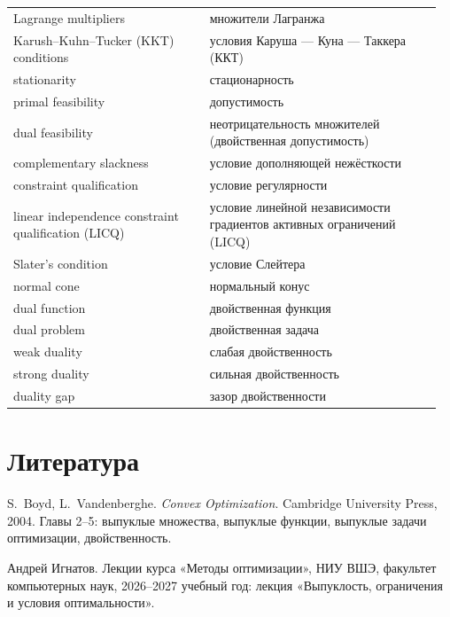 \documentclass[11pt,a4paper]{article}
\begin{document}
\begin{longtable}{@{}>{\raggedright\arraybackslash}p{0.44\linewidth}>{\raggedright\arraybackslash}p{0.52\linewidth}@{}}
\textenglish{Lagrange multipliers} & множители Лагранжа \\
\textenglish{Karush–Kuhn–Tucker (KKT) conditions} & условия Каруша — Куна — Таккера (ККТ) \\
\textenglish{stationarity} & стационарность \\
\textenglish{primal feasibility} & допустимость \\
\textenglish{dual feasibility} & неотрицательность множителей (двойственная допустимость) \\
\textenglish{complementary slackness} & условие дополняющей нежёсткости \\
\textenglish{constraint qualification} & условие регулярности \\
\textenglish{linear independence constraint qualification (LICQ)} & условие линейной независимости градиентов активных ограничений (LICQ) \\
\textenglish{Slater's condition} & условие Слейтера \\
\textenglish{normal cone} & нормальный конус \\
\textenglish{dual function} & двойственная функция \\
\textenglish{dual problem} & двойственная задача \\
\textenglish{weak duality} & слабая двойственность \\
\textenglish{strong duality} & сильная двойственность \\
\textenglish{duality gap} & зазор двойственности \\
\end{longtable}

\section{Литература}\label{sec:references}

\begin{enumerate}[label={[\arabic*]}, leftmargin=*]
  \item \textenglish{S.~Boyd, L.~Vandenberghe. \emph{Convex Optimization}. Cambridge University Press, 2004.} Главы 2–5: выпуклые множества, выпуклые функции, выпуклые задачи оптимизации, двойственность.
  \item Андрей Игнатов. Лекции курса «Методы оптимизации», НИУ ВШЭ, факультет компьютерных наук, 2026–2027 учебный год: лекция «Выпуклость, ограничения и условия оптимальности».
\end{enumerate}
\end{document}
